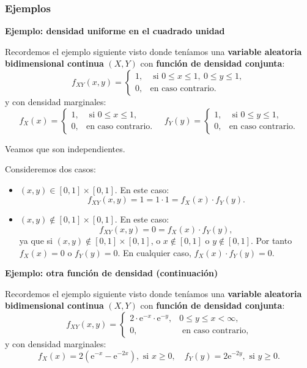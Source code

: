 \documentclass[]{book}
\begin{document}
\hypertarget{ejemplos-2}{%
\subsubsection{Ejemplos}\label{ejemplos-2}}

\textbf{Ejemplo: densidad uniforme en el cuadrado unidad}

Recordemos el ejemplo siguiente visto donde teníamos una \textbf{variable aleatoria bidimensional continua} \((X,Y)\) con
\textbf{función de densidad conjunta}:
\[
f_{XY}(x,y)=\begin{cases}
1, & \mbox{ si }0\leq x\leq 1,\ 0\leq y\leq 1, \\
0, & \mbox{en caso contrario.}
\end{cases}
\]
y con densidad marginales:
\[
f_{X}(x)=\begin{cases}
1, & \mbox{ si }0\leq x\leq 1,\\
0, & \mbox{en caso contrario.}
\end{cases}\quad f_{Y}(y)=\begin{cases}
1, & \mbox{ si }0\leq y\leq 1,\\
0, & \mbox{en caso contrario.}
\end{cases}
\]

Veamos que son independientes.

Consideremos dos casos:

\begin{itemize}
\item
  \((x,y)\in [0,1]\times [0,1]\). En este caso:
  \[
  f_{XY}(x,y) =1 =1\cdot 1=f_X(x)\cdot f_Y(y).
  \]
\item
  \((x,y)\not\in [0,1]\times [0,1]\). En este caso:
  \[
  f_{XY}(x,y) =0 = f_X(x)\cdot f_Y(y),
  \]
  ya que si \((x,y)\not\in [0,1]\times [0,1]\), o \(x\not\in [0,1]\) o \(y\not\in [0,1]\). Por tanto \(f_X(x)=0\) o \(f_Y(y)=0\). En cualquier caso, \(f_X(x)\cdot f_Y(y)=0\).
\end{itemize}

\textbf{Ejemplo: otra función de densidad (continuación)}

Recordemos el ejemplo siguiente visto donde teníamos una \textbf{variable aleatoria bidimensional continua} \((X,Y)\) con \textbf{función de densidad conjunta}:
\[
f_{XY}(x,y)=\begin{cases}
2 \cdot \mathrm{e}^{-x}\cdot\mathrm{e}^{-y}, & 0\leq y\leq x < \infty,\\
0, & \mbox{ en caso contrario,}
\end{cases}
\]
y con densidad marginales:
\[
f_X(x)  = 2\left(\mathrm{e}^{-x}-\mathrm{e}^{-2x}\right),\mbox{ si }x\geq 0, \quad
f_Y(y)  =  2\mathrm{e}^{-2y}, \mbox{ si }y\geq 0.
\]
\end{document}
